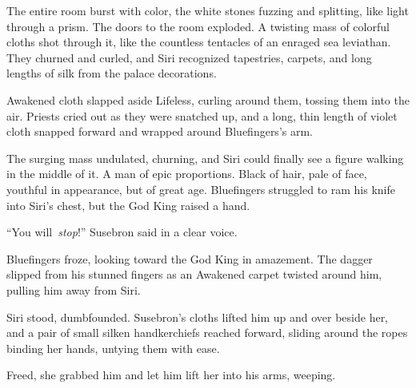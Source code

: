 The entire room burst with color, the white stones fuzzing and splitting, like light through a prism. The doors to the room exploded. A twisting mass of colorful cloths shot through it, like the countless tentacles of an enraged sea leviathan. They churned and curled, and Siri recognized tapestries, carpets, and long lengths of silk from the palace decorations.

Awakened cloth slapped aside Lifeless, curling around them, tossing them into the air. Priests cried out as they were snatched up, and a long, thin length of violet cloth snapped forward and wrapped around Bluefingers’s arm.

The surging mass undulated, churning, and Siri could finally see a figure walking in the middle of it. A man of epic proportions. Black of hair, pale of face, youthful in appearance, but of great age. Bluefingers struggled to ram his knife into Siri’s chest, but the God King raised a hand.

“You will~\textit{stop}!” Susebron said in a clear voice.

Bluefingers froze, looking toward the God King in amazement. The dagger slipped from his stunned fingers as an Awakened carpet twisted around him, pulling him away from Siri.

Siri stood, dumbfounded. Susebron’s cloths lifted him up and over beside her, and a pair of small silken handkerchiefs reached forward, sliding around the ropes binding her hands, untying them with ease.

Freed, she grabbed him and let him lift her into his arms, weeping.

